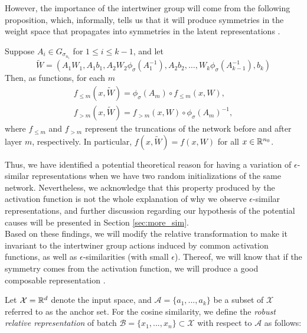 \documentclass[../main.tex]{subfiles}
\begin{document}
However, the importance of the intertwiner group will come from the following proposition, which, informally, tells us that it will produce symmetries in the weight space that propagates into symmetries in the latent representations \cite{godfrey_symmetries_2023}.

\begin{proposition}
  \label{lem:comm-w-sig}
  Suppose $A_i \in G_{\sigma_{n_i}}$ for $1 \leq i \leq k-1$, and let 
  \begin{equation*}
  \widetilde{W}  = (A_1 W_1, A_1b_1, A_2 W_2 \phi_{\sigma}(A_1^{-1}), A_2 b_2 , \dots,
  W_{k}\phi_{\sigma}(A_{k-1}^{-1}), b_{k})
  \end{equation*}
  Then, as functions, for each $m$
  \begin{gather*}
       f_{\leq m}(x, \widetilde{W} ) = \phi_\sigma(A_m) \circ f_{\leq m}(x, W),\\
       f_{> m}(x, \widetilde{W} ) = f_{>m}(x, W) \circ \phi_{\sigma}(A_m)^{-1},
  \end{gather*}
  where $f_{\leq m}$ and $f_{> m}$ represent the truncations of the network before and after layer $m$, respectively. In particular, $f(x, \widetilde{W} ) = f(x, W)$ for all $x \in \mathbb{R}^{n_0}$.
\end{proposition}

Thus, we have identified a potential theoretical reason for having a variation of $\epsilon$-similar representations when we have two random initializations of the same network. Nevertheless, we acknowledge that this property produced by the activation function is not the whole explanation of why we observe $\epsilon$-similar representations, and further discussion regarding our hypothesis of the potential causes will be presented in Section \ref{sec:more_sim}.\\

Based on these findings, we will modify the relative transformation to make it invariant to the intertwiner group actions induced by common activation functions, as well as $\epsilon$-similarities (with small $\epsilon$). Thereof, we will know that if the symmetry comes from the activation function, we will produce a good composable representation \cite[Theorem 4.2]{godfrey_symmetries_2023}.

Let $\mathcal{X}=\mathbb{R}^d$ denote the input space, and $\mathcal{A}= \{a_1, ..., a_k\}$ be a subset of $\mathcal{X}$ referred to as the anchor set. For the cosine similarity, we define the \emph{robust relative representation} of batch $\mathcal{B} = \{x_1, ..., x_n\}\subset \mathcal{X}$ with respect to $\mathcal{A}$ as follows:
\end{document}
